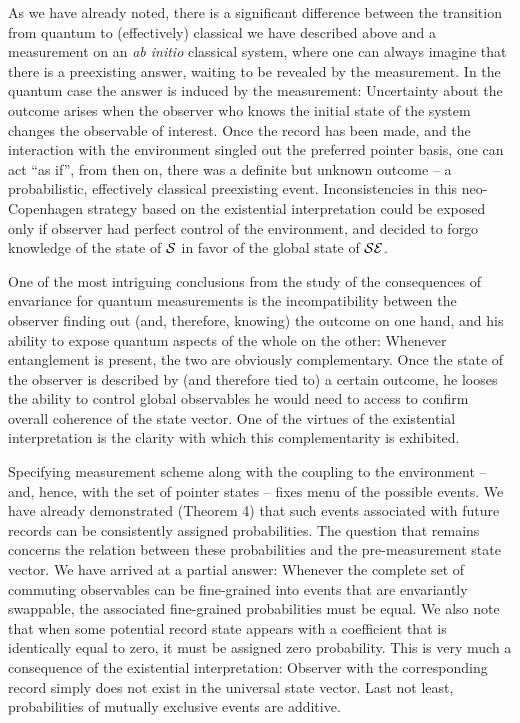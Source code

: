 \documentclass[aps,twocolumn,pra,epsfig]{revtex4}
\begin{document}
As we have already noted, there is a significant difference between
the transition from quantum to (effectively) classical we have described
above and a measurement on an {\it ab initio} classical system, where one can
always imagine that there is a preexisting answer, waiting to be revealed by
the measurement. In the quantum case the answer is induced by the measurement:
Uncertainty about the outcome arises when the observer who knows the initial
state of the system changes the observable of interest. Once the record has
been made, and the interaction with the environment singled out the preferred
pointer basis, one can act ``as if'', from then on, there was a definite but
unknown outcome -- a probabilistic, effectively classical preexisting event.
Inconsistencies in this neo-Copenhagen strategy based on the existential
interpretation could be exposed only if observer had perfect control
of the environment, and decided to forgo knowledge of the
state of ${\cal S}$ in favor of the global state of ${\cal SE}$.

One of the most intriguing conclusions from the study of the consequences of
envariance for quantum measurements is the incompatibility between the observer
finding out (and, therefore, knowing) the outcome on one hand, and his ability
to expose quantum aspects of the whole on the other: Whenever entanglement is
present, the two are obviously
complementary. Once the state of the observer is described by (and therefore
tied to) a certain outcome, he looses the ability to control global observables
he would need to access to confirm overall coherence of the state vector.
One of the virtues of the existential interpretation is the clarity with which
this complementarity is exhibited.

Specifying measurement scheme along with the coupling to the environment
-- and, hence, with the set of pointer states -- fixes menu of the possible
events. We have already demonstrated (Theorem 4) that such events associated
with future records can be consistently assigned probabilities. The question
that remains concerns the relation between these probabilities and the
pre-measurement state vector. We have arrived at a partial answer:
Whenever the complete set of commuting observables can be fine-grained into
events that are envariantly swappable, the associated fine-grained
probabilities must be equal. We also note that when some potential record
state appears with a coefficient that is identically equal to zero, it must
be assigned zero probability. This is very much a consequence of the 
existential
interpretation: Observer with the corresponding record simply does not exist
in the universal state vector. Last not least, probabilities of mutually
exclusive events are additive.
\end{document}
